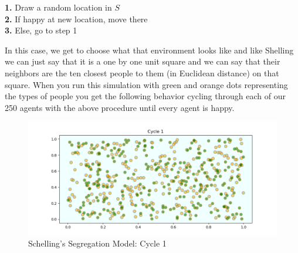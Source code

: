 \documentclass[12pt,twoside]{reedthesis}
\begin{document}
\begin{adjustwidth}{1cm}{}
	\textbf{1.} Draw a random location in $S$ \\
	\textbf{2.} If happy at new location, move there\\
	\textbf{3.} Else, go to step 1
\end{adjustwidth}

In this case, we get to choose what that environment looks like and like Shelling we can just say that it is a one by one unit square and we can say that their neighbors are the ten closest people to them (in Euclidean distance) on that square. When you run this simulation with green and orange dots representing the types of people you get the following behavior cycling through each of our 250 agents with the above procedure until every agent is happy. 

\begin{figure}[h!]
	\centering
	\includegraphics[scale=0.5]{Figures/segregation_1}
	\caption{Schelling's Segregation Model: Cycle 1}
	\label{SSM1_ch1}
\end{figure}
\end{document}
